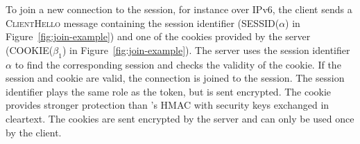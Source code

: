 To join a new \tcp connection to the \tcpls session, for instance over IPv6, the
client sends a \textsc{ClientHello} message containing the session identifier
(SESSID($\alpha$) in Figure~\ref{fig:join-example}) and one of the cookies
provided by the server (COOKIE($\beta_1$) in Figure~\ref{fig:join-example}). The
server uses the session identifier $\alpha$ to find the corresponding \tcpls
session and checks the validity of the cookie. If the \tcpls session and cookie
are valid, the \tcp connection is joined to the \tcpls session. The session
identifier plays the same role as the \mptcp token, but is sent encrypted. The
cookie provides stronger protection than \mptcp's HMAC with security keys
exchanged in cleartext. The \tcpls cookies are sent encrypted by the server and 
can only be used once by the client.



